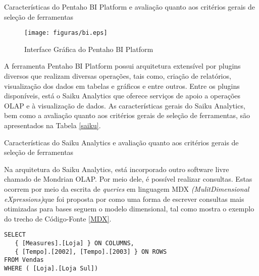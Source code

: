 \begin{table}[!ht]

\caption{Características do Pentaho BI Platform e avaliação quanto aos critérios gerais de seleção de ferramentas}
\label{biserver}
\end{table}
\FloatBarrier



\begin{figure}[ht!]
\begin{center}
\texttt{[image: figuras/bi.eps]}
\caption{Interface Gráfica do Pentaho BI Platform}
\label{BIplatform}
\end{center}
\end{figure}
\FloatBarrier
 

A ferramenta Pentaho BI Platform possui arquitetura extensível por plugins diversos que realizam diversas operações, tais como, criação de relatórios, visualização dos dados em tabelas e gráficos e entre outros. Entre os plugins disponíveis, está o Saiku Analytics que oferece serviços de apoio a operações OLAP e à visualização de dados. As características gerais do Saiku Analytics, bem como a avaliação quanto aos critérios gerais de seleção de ferramentas, são apresentados na Tabela \ref{saiku}. 

\begin{table}[!ht]

\caption{Características do Saiku Analytics e avaliação quanto aos critérios gerais de seleção de ferramentas}
\label{saiku}
\end{table}
\FloatBarrier

Na arquitetura do Saiku Analytics, está incorporado outro software livre chamado de Mondrian OLAP. Por meio dele, é possível realizar  consultas. Estas ocorrem por meio da escrita de \textit{queries} em linguagem MDX \textit{(MulitDimensional eXpressions)}que foi proposta por  como uma forma de escrever consultas mais otimizadas para bases seguem o modelo dimensional, tal como mostra o exemplo do trecho de Código-Fonte \ref{MDX}.


\begin{center}
\begin{minipage}{0.5\textwidth}

\begin{lstlisting}[caption=Exemplo de \textit{Query} em linguagem MDX, label=MDX]
 SELECT
   { [Measures].[Loja] } ON COLUMNS,
   { [Tempo].[2002], [Tempo].[2003] } ON ROWS
FROM Vendas
WHERE ( [Loja].[Loja Sul]) 

\end{lstlisting}
\end{minipage}
\end{center}
\FloatBarrier

